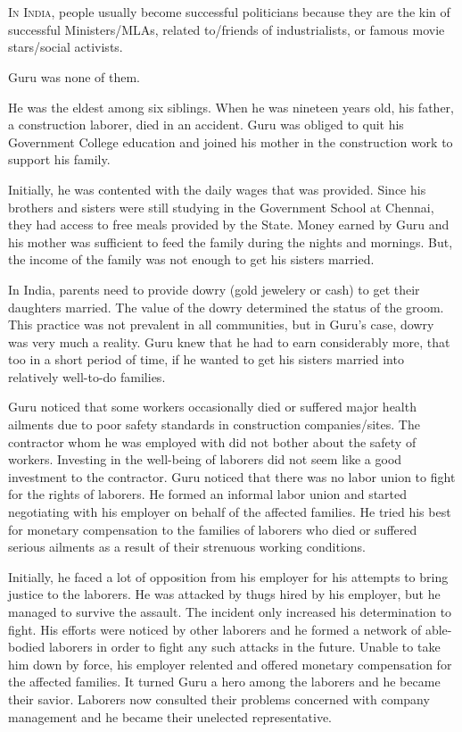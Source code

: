 \chapter{}

\lettrine{I}{n India}, people usually become successful politicians because they are the kin
of successful Ministers/MLAs, related to/friends of industrialists, or famous
movie stars/social activists.

Guru was none of them.

He was the eldest among six siblings. When he was nineteen years old, his
father, a construction laborer, died in an accident. Guru was obliged to quit
his Government College education and joined his mother in the construction work
to support his family.

Initially, he was contented with the daily wages that was provided. Since his
brothers and sisters were still studying in the Government School at Chennai,
they had access to free meals provided by the State. Money earned by Guru and
his mother was sufficient to feed the family during the nights and mornings.
But, the income of the family was not enough to get his sisters married.

In India, parents need to provide dowry (gold jewelery or cash) to get their
daughters married. The value of the dowry determined the status of the groom.
This practice was not prevalent in all communities, but in Guru's case, dowry
was very much a reality. Guru knew that he had to earn considerably more, that
too in a short period of time, if he wanted to get his sisters married into
relatively well-to-do families.

Guru noticed that some workers occasionally died or suffered major health
ailments due to poor safety standards in construction companies/sites. The
contractor whom he was employed with did not bother about the safety of workers.
Investing in the well-being of laborers did not seem like a good investment to
the contractor. Guru noticed that there was no labor union to fight for the
rights of laborers. He formed an informal labor union and started negotiating
with his employer on behalf of the affected families. He tried his best for
monetary compensation to the families of laborers who died or suffered serious
ailments as a result of their strenuous working conditions.

Initially, he faced a lot of opposition from his employer for his attempts to
bring justice to the laborers. He was attacked by thugs hired by his employer,
but he managed to survive the assault. The incident only increased his
determination to fight. His efforts were noticed by other laborers and he formed
a network of able-bodied laborers in order to fight any such attacks in the
future. Unable to take him down by force, his employer relented and offered
monetary compensation for the affected families. It turned Guru a hero among the
laborers and he became their savior. Laborers now consulted their problems
concerned with company management and he became their unelected representative.

